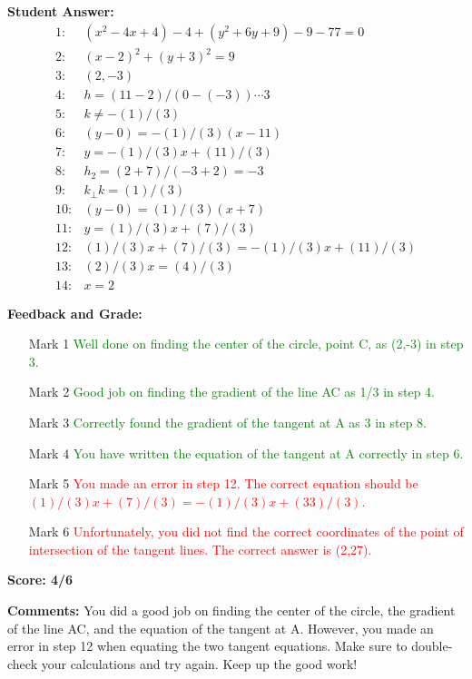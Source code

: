\documentclass{article}
\begin{document}
\textbf{Student Answer:}
\begin{align*}
1: & (x^{2}-4x+4)-4+(y^{2}+6y+9)-9-77=0 \\
2: & (x-2)^{2}+(y+3)^{2}=9 \\
3: & (2,-3) \\
4: & h=(11-2)/(0-(-3))\cdots3 \\
5: & k\neq-(1)/(3) \\
6: & (y-0)=-(1)/(3)(x-11) \\
7: & y=-(1)/(3)x+(11)/(3) \\
8: & h_2=(2+7)/(-3+2)=-3 \\
9: & k_{\perp} k=(1)/(3) \\
10: & (y-0)=(1)/(3)(x+7) \\
11: & y=(1)/(3)x+(7)/(3) \\
12: & (1)/(3)x+(7)/(3)=-(1)/(3)x+(11)/(3) \\
13: & (2)/(3)x=(4)/(3) \\
14: & x=2
\end{align*}

\textbf{Feedback and Grade:}
\begin{itemize}
\item[Mark 1] \textcolor{green}{Well done on finding the center of the circle, point C, as (2,-3) in step 3.}
\item[Mark 2] \textcolor{green}{Good job on finding the gradient of the line AC as 1/3 in step 4.}
\item[Mark 3] \textcolor{green}{Correctly found the gradient of the tangent at A as 3 in step 8.}
\item[Mark 4] \textcolor{green}{You have written the equation of the tangent at A correctly in step 6.}
\item[Mark 5] \textcolor{red}{You made an error in step 12. The correct equation should be $(1)/(3)x+(7)/(3)=-(1)/(3)x+(33)/(3)$.}
\item[Mark 6] \textcolor{red}{Unfortunately, you did not find the correct coordinates of the point of intersection of the tangent lines. The correct answer is (2,27).}
\end{itemize}

\textbf{Score: 4/6}

\textbf{Comments:} You did a good job on finding the center of the circle, the gradient of the line AC, and the equation of the tangent at A. However, you made an error in step 12 when equating the two tangent equations. Make sure to double-check your calculations and try again. Keep up the good work!
\end{document}
